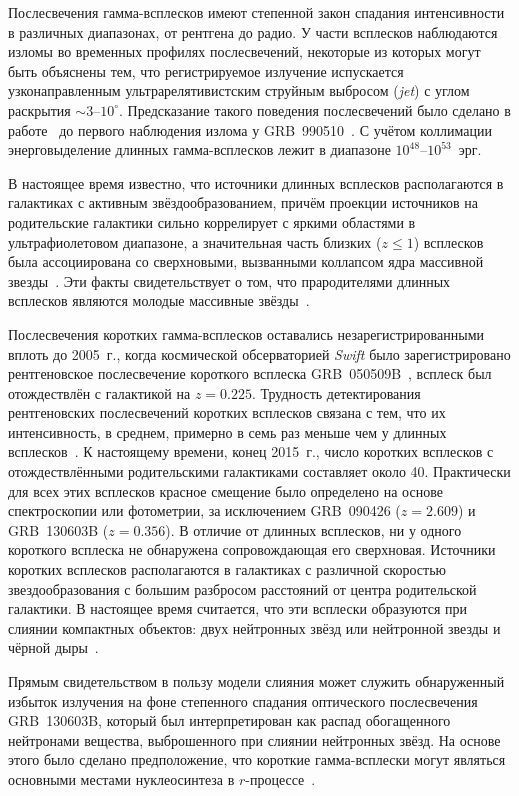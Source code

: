 Послесвечения гамма-всплесков имеют степенной закон спадания интенсивности в различных
диапазонах, от рентгена до радио. У части всплесков наблюдаются изломы во временных профилях послесвечений,
некоторые из которых могут быть объяснены тем, что регистрируемое излучение испускается
узконаправленным ультрарелятивистским струйным выбросом (\textit{jet}) с углом раскрытия $\sim 3\mbox{--}10^{\circ}$. 
Предсказание такого поведения послесвечений было сделано в работе~\citep{Rhoads_1999ApJ} 
до первого наблюдения излома у GRB~990510~\citep{Stanek_1999ApJ}. 
С учётом коллимации энерговыделение длинных гамма-всплесков лежит в диапазоне $10^{48}$--$10^{53}$~эрг.

В настоящее время известно, что источники длинных всплесков располагаются в галактиках 
с активным звёздообразованием, причём проекции источников на родительские галактики сильно
коррелирует с яркими областями в ультрафиолетовом диапазоне, а значительная часть 
близких ($z \le 1$) всплесков была ассоциирована со сверхновыми, вызванными 
коллапсом ядра массивной звезды~\citep{Hjorth_and_Bloom_2012in_book}.
Эти факты свидетельствует о том, что прародителями длинных всплесков являются молодые 
массивные звёзды~\citep[см. обзор][]{Berger_2014ARAA}.

Послесвечения коротких гамма-всплесков оставались незарегистрированными вплоть 
до 2005~г., когда космической обсерваторией \textit{Swift} было зарегистрировано 
рентгеновское послесвечение короткого всплеска GRB~050509B~\citep{Gehrels_2005Natur},
всплеск был отождествлён с галактикой на $z=0.225$. 
Трудность детектирования рентгеновских послесвечений коротких всплесков 
связана с тем, что их интенсивность, в среднем, примерно в семь раз меньше чем у 
длинных всплесков~\citep{Berger_2014ARAA}. 
К настоящему времени, конец 2015~г., число коротких всплесков с отождествлёнными 
родительскими галактиками составляет около 40. 
Практически для всех этих всплесков красное смещение было определено на основе 
спектроскопии или фотометрии, за исключением GRB~090426 ($z = 2.609$) и GRB~130603B ($z = 0.356$).
В отличие от длинных всплесков, ни у одного короткого всплеска не обнаружена сопровождающая его сверхновая.
Источники коротких всплесков располагаются в галактиках с различной скоростью 
звездообразования с большим разбросом расстояний от центра родительской галактики. 
В настоящее время считается, что эти всплески образуются при слиянии компактных 
объектов: двух нейтронных звёзд или нейтронной звезды и чёрной дыры~\citep{Berger_2014ARAA}.

Прямым свидетельством в пользу модели слияния может служить обнаруженный избыток 
излучения на фоне степенного спадания оптического послесвечения GRB~130603B, 
который был интерпретирован как распад обогащенного нейтронами вещества, 
выброшенного при слиянии нейтронных звёзд. На основе этого было сделано предположение, 
что короткие гамма-всплески могут являться основными местами нуклеосинтеза в 
$r$-процессе~\citep{Tanvir_2013Natur}.
 
